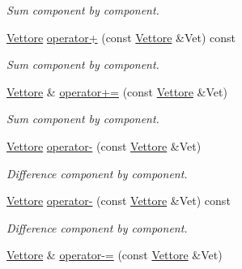 \begin{DoxyCompactItemize}
\begin{DoxyCompactList}\small\item\em Sum component by component. \end{DoxyCompactList}\item 
\hyperlink{classVettore}{Vettore} \hyperlink{classVettore_a90957078ca1e1545f53a7067cf712421}{operator+} (const \hyperlink{classVettore}{Vettore} \&Vet) const \hypertarget{classVettore_a90957078ca1e1545f53a7067cf712421}{}\label{classVettore_a90957078ca1e1545f53a7067cf712421}

\begin{DoxyCompactList}\small\item\em Sum component by component. \end{DoxyCompactList}\item 
\hyperlink{classVettore}{Vettore} \& \hyperlink{classVettore_a51ea7bee6d49e4b483dc91a38a6bcbe6}{operator+=} (const \hyperlink{classVettore}{Vettore} \&Vet)\hypertarget{classVettore_a51ea7bee6d49e4b483dc91a38a6bcbe6}{}\label{classVettore_a51ea7bee6d49e4b483dc91a38a6bcbe6}

\begin{DoxyCompactList}\small\item\em Sum component by component. \end{DoxyCompactList}\item 
\hyperlink{classVettore}{Vettore} \hyperlink{classVettore_a8a8192a424c70ae12496037159ef2294}{operator-\/} (const \hyperlink{classVettore}{Vettore} \&Vet)\hypertarget{classVettore_a8a8192a424c70ae12496037159ef2294}{}\label{classVettore_a8a8192a424c70ae12496037159ef2294}

\begin{DoxyCompactList}\small\item\em Difference component by component. \end{DoxyCompactList}\item 
\hyperlink{classVettore}{Vettore} \hyperlink{classVettore_a36b8a08fa27542f550b9b59d08fa4a45}{operator-\/} (const \hyperlink{classVettore}{Vettore} \&Vet) const \hypertarget{classVettore_a36b8a08fa27542f550b9b59d08fa4a45}{}\label{classVettore_a36b8a08fa27542f550b9b59d08fa4a45}

\begin{DoxyCompactList}\small\item\em Difference component by component. \end{DoxyCompactList}\item 
\hyperlink{classVettore}{Vettore} \& \hyperlink{classVettore_a3550f84cde64fde6694c6ecc67e08dae}{operator-\/=} (const \hyperlink{classVettore}{Vettore} \&Vet)\hypertarget{classVettore_a3550f84cde64fde6694c6ecc67e08dae}{}\label{classVettore_a3550f84cde64fde6694c6ecc67e08dae}


\end{DoxyCompactItemize}
